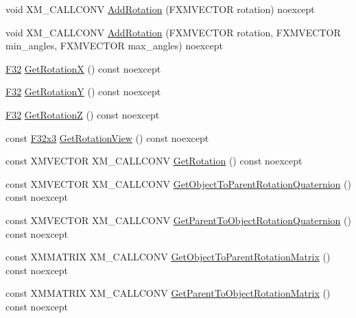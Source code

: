 \begin{DoxyCompactItemize}
\item 
void X\+M\+\_\+\+C\+A\+L\+L\+C\+O\+NV \mbox{\hyperlink{classmage_1_1_s_e_t_transform3_d_aff1e1060cb6247122b4e71b9a5fe03e8}{Add\+Rotation}} (F\+X\+M\+V\+E\+C\+T\+OR rotation) noexcept
\item 
void X\+M\+\_\+\+C\+A\+L\+L\+C\+O\+NV \mbox{\hyperlink{classmage_1_1_s_e_t_transform3_d_af7aec6f824f181bf29b2868e34dd95bd}{Add\+Rotation}} (F\+X\+M\+V\+E\+C\+T\+OR rotation, F\+X\+M\+V\+E\+C\+T\+OR min\+\_\+angles, F\+X\+M\+V\+E\+C\+T\+OR max\+\_\+angles) noexcept
\item 
\mbox{\hyperlink{namespacemage_aa97e833b45f06d60a0a9c4fc22ae02c0}{F32}} \mbox{\hyperlink{classmage_1_1_s_e_t_transform3_d_ae24e2d17b5366d1fb8a3e04187d17ab7}{Get\+RotationX}} () const noexcept
\item 
\mbox{\hyperlink{namespacemage_aa97e833b45f06d60a0a9c4fc22ae02c0}{F32}} \mbox{\hyperlink{classmage_1_1_s_e_t_transform3_d_a7e9461b62fc90558c04777e3872e7512}{Get\+RotationY}} () const noexcept
\item 
\mbox{\hyperlink{namespacemage_aa97e833b45f06d60a0a9c4fc22ae02c0}{F32}} \mbox{\hyperlink{classmage_1_1_s_e_t_transform3_d_a6aa3d62b58c61461eeadcab1f7129f85}{Get\+RotationZ}} () const noexcept
\item 
const \mbox{\hyperlink{namespacemage_a1e3c7a882af461f161caa1cbddaf1fa2}{F32x3}} \mbox{\hyperlink{classmage_1_1_s_e_t_transform3_d_aa9cef9ce4b9de0b07c80b6efb7e00964}{Get\+Rotation\+View}} () const noexcept
\item 
const X\+M\+V\+E\+C\+T\+OR X\+M\+\_\+\+C\+A\+L\+L\+C\+O\+NV \mbox{\hyperlink{classmage_1_1_s_e_t_transform3_d_ace617bb6fca4c08b99446552121b50c1}{Get\+Rotation}} () const noexcept
\item 
const X\+M\+V\+E\+C\+T\+OR X\+M\+\_\+\+C\+A\+L\+L\+C\+O\+NV \mbox{\hyperlink{classmage_1_1_s_e_t_transform3_d_a5853b2bcc7ae145c1898db8d91f9c67a}{Get\+Object\+To\+Parent\+Rotation\+Quaternion}} () const noexcept
\item 
const X\+M\+V\+E\+C\+T\+OR X\+M\+\_\+\+C\+A\+L\+L\+C\+O\+NV \mbox{\hyperlink{classmage_1_1_s_e_t_transform3_d_a044bb59a385aac268020d54e315b6fe5}{Get\+Parent\+To\+Object\+Rotation\+Quaternion}} () const noexcept
\item 
const X\+M\+M\+A\+T\+R\+IX X\+M\+\_\+\+C\+A\+L\+L\+C\+O\+NV \mbox{\hyperlink{classmage_1_1_s_e_t_transform3_d_ab6cc8c2dcc450b64d19f21bb319530a0}{Get\+Object\+To\+Parent\+Rotation\+Matrix}} () const noexcept
\item 
const X\+M\+M\+A\+T\+R\+IX X\+M\+\_\+\+C\+A\+L\+L\+C\+O\+NV \mbox{\hyperlink{classmage_1_1_s_e_t_transform3_d_a116c69e964c7f49fc76639c739199ad5}{Get\+Parent\+To\+Object\+Rotation\+Matrix}} () const noexcept

\end{DoxyCompactItemize}
